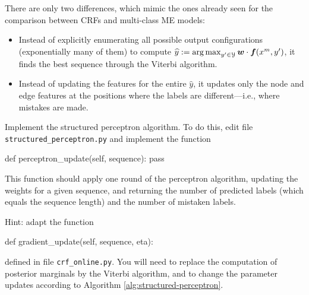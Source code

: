 There are only two differences, which mimic the ones already seen for the comparison between CRFs 
and multi-class ME models:
\begin{itemize}
\item Instead of explicitly enumerating all possible output 
configurations (exponentially many of them) to compute 
 $\widehat{y} := \operatorname*{arg\,max}_{y'\in\mathcal{Y}} \boldsymbol{w} \cdot \boldsymbol{f}(x^m,y')$, 
it finds the best sequence through the Viterbi algorithm. 
\item Instead of updating the features for the entire $\widehat{y}$, 
it updates only the node and edge features at the positions where the
  labels are different---i.e., where mistakes are made.
\end{itemize}





\begin{exercise}\label{exer:strucperc1}
Implement the structured perceptron algorithm. 
To do this, edit file {\tt structured\_perceptron.py} 
and implement the function
\begin{python}
def perceptron_update(self, sequence):
    pass
\end{python}
This function should apply one round of the perceptron algorithm,
updating the weights for a given sequence, and returning
the number of predicted labels (which equals the sequence length) 
and the number of mistaken labels. 

Hint: adapt the function 
\begin{python}
def gradient_update(self, sequence, eta):
\end{python}
defined in file {\tt crf\_online.py}. 
You will need to replace the computation of posterior marginals 
by the Viterbi algorithm, and to change the parameter updates 
according to Algorithm \ref{alg:structured-perceptron}.
\end{exercise}


